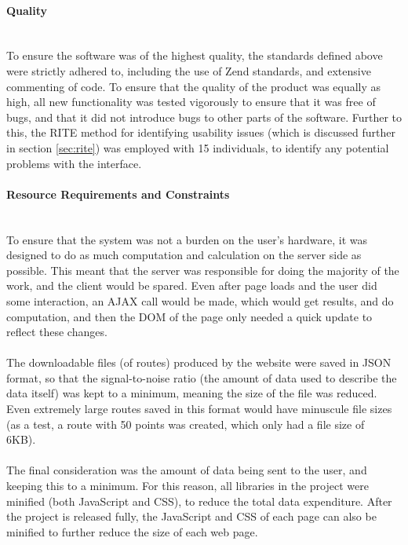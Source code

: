 \paragraph{Quality}\ \\
To ensure the software was of the highest quality, the standards defined above were strictly adhered to, including the use of Zend standards, and extensive commenting of code. To ensure that the quality of the product was equally as high, all new functionality was tested vigorously to ensure that it was free of bugs, and that it did not introduce bugs to other parts of the software. Further to this, the RITE method for identifying usability issues (which is discussed further in section \ref{sec:rite}) was employed with 15 individuals, to identify any potential problems with the interface. 

\paragraph{Resource Requirements and Constraints}\ \\
To ensure that the system was not a burden on the user's hardware, it was designed to do as much computation and calculation on the server side as possible. This meant that the server was responsible for doing the majority of the work, and the client would be spared. Even after page loads and the user did some interaction, an AJAX call would be made, which would get results, and do computation, and then the DOM of the page only needed a quick update to reflect these changes.\ \\
\ \\
The downloadable files (of routes) produced by the website were saved in JSON format, so that the signal-to-noise ratio (the amount of data used to describe the data itself) was kept to a minimum, meaning the size of the file was reduced. Even extremely large routes saved in this format would have minuscule file sizes (as a test, a route with 50 points was created, which only had a file size of 6KB).\ \\
\ \\
The final consideration was the amount of data being sent to the user, and keeping this to a minimum. For this reason, all libraries in the project were minified (both JavaScript and CSS), to reduce the total data expenditure. After the project is released fully, the JavaScript and CSS of each page can also be minified to further reduce the size of each web page. 

